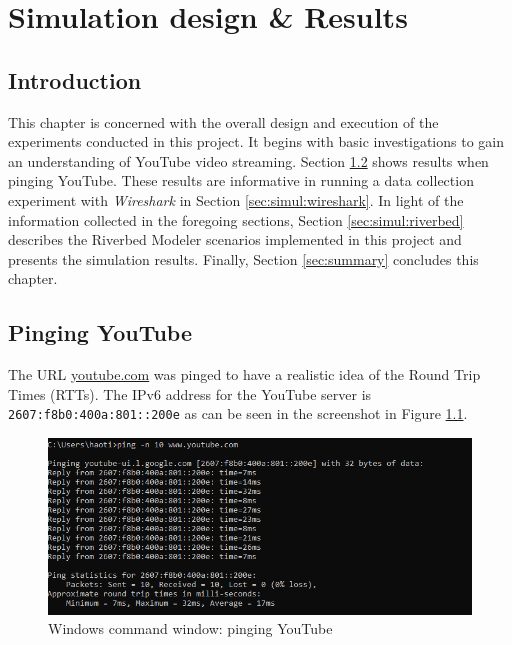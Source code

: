 \chapter{Simulation design \& Results} \label{chapter:simul}

\section{Introduction} \label{sec:simul:intro}
This chapter is concerned with the overall design and execution of the experiments conducted in this project. It begins with basic investigations to gain an understanding of YouTube video streaming. Section \ref{sec:simul:ping} shows results when pinging YouTube. These results are informative in running a data collection experiment with \textit{Wireshark} in Section \ref{sec:simul:wireshark}. In light of the information collected in the foregoing sections, Section \ref{sec:simul:riverbed} describes the Riverbed Modeler scenarios implemented in this project and presents the simulation results. Finally, Section \ref{sec:summary} concludes this chapter.

\section{Pinging YouTube} \label{sec:simul:ping}
The URL \url{youtube.com} was pinged to have a realistic idea of the Round Trip Times (\gls{RTT}s). The \gls{IPv6} address for the YouTube server is \verb|2607:f8b0:400a:801::200e| as can be seen in the screenshot in Figure \ref{fig:sim:ping}.

\begin{figure}[H]
	\centering
	\includegraphics[scale=0.8]{Figures/image1.png}
	\caption{Windows command window: pinging YouTube}
	\label{fig:sim:ping}
\end{figure}


